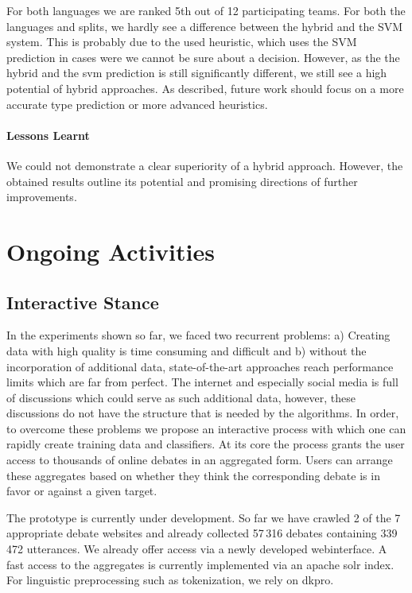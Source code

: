 \documentclass[11pt]{article}
\begin{document}
For both languages we are ranked 5th out of 12 participating teams.
For both the languages and splits, we hardly see a difference between the hybrid and the SVM system. 
This is probably due to the used heuristic, which uses the SVM prediction in cases were we cannot be sure about a decision.
However, as the the hybrid and the svm prediction is still significantly different, we still see a high potential of hybrid approaches.
As described, future work should focus on a more accurate type prediction or more advanced heuristics.

\paragraph{Lessons Learnt}
We could not demonstrate a clear superiority of a hybrid approach.
However, the obtained results outline its potential and promising directions of further improvements.

\section{Ongoing Activities}

\subsection{Interactive Stance}
In the experiments shown so far, we faced two recurrent problems: a) Creating data with high quality is time consuming and difficult  and b) without the incorporation of additional data, state-of-the-art approaches reach performance limits which are far from perfect. 
The internet and especially social media is full of discussions which could serve as such additional data, however, these discussions do not have the structure that is needed by the algorithms.
In order, to overcome these problems we propose an interactive process with which one can rapidly create training data and classifiers.
At its core the process grants the user access to thousands of online debates in an aggregated form.
Users can arrange these aggregates based on whether they think the corresponding debate is in favor or against a given target.

The prototype is currently under development.
So far we have crawled 2 of the 7 appropriate debate websites and already collected 57\,316 debates containing 339\,472 utterances.
We already offer access via a newly developed webinterface.  
A fast access to the aggregates is currently implemented via an apache solr index.
For linguistic preprocessing such as tokenization, we rely on dkpro.
\end{document}
